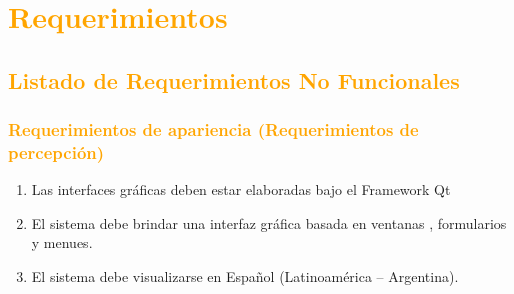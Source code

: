 

\newpage
\section{\textcolor{orange}{Requerimientos}}
\subsection{\textcolor{orange}{Listado de Requerimientos No Funcionales}}
\subsubsection{\textcolor{orange}{Requerimientos de apariencia
(Requerimientos de percepción)}}
\begin{enumerate}
\item Las interfaces gráficas deben estar elaboradas bajo el Framework Qt
\item El sistema debe brindar una interfaz gráfica basada en ventanas ,
formularios y menues.
\item El sistema debe visualizarse en Español (Latinoamérica – Argentina).
\end{enumerate}


